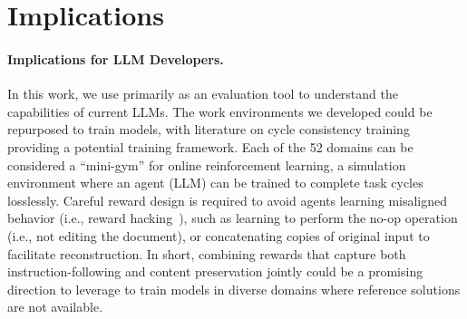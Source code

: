 \documentclass{article} %
\begin{document}



\vspace{3\intextsep}
\section{Implications} \label{sec:implications}

\paragraph{Implications for LLM Developers.} In this work, we use \benchmark{} primarily as an evaluation tool to understand the capabilities of current LLMs. The work environments we developed could be repurposed to train models, with literature on cycle consistency training \citep{Zhu2017UnpairedIT} providing a potential training framework. Each of the 52 domains can be considered a ``mini-gym'' for online reinforcement learning, a simulation environment where an agent (LLM) can be trained to complete task cycles losslessly. Careful reward design is required to avoid agents learning misaligned behavior (i.e., reward hacking~\citep{Skalse2022DefiningAC}), such as learning to perform the no-op operation (i.e., not editing the document), or concatenating copies of original input to facilitate reconstruction. In short, combining rewards that capture both instruction-following and content preservation jointly could be a promising direction to leverage \benchmark{} to train models in diverse domains where reference solutions are not available.
\end{document}
